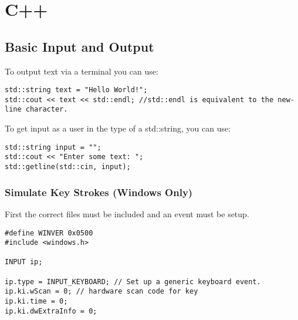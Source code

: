 \chapter{C++}
\thispagestyle{fancy}
\lstset{language=C++, style=cpp}

\section{Basic Input and Output}
To output text via a terminal you can use:
\begin{lstlisting}
std::string text = "Hello World!";
std::cout << text << std::endl; //std::endl is equivalent to the new-line character.
\end{lstlisting}

To get input as a user in the type of a std::string, you can use:
\begin{lstlisting}
std::string input = "";
std::cout << "Enter some text: ";
std::getline(std::cin, input);
\end{lstlisting}

\subsection{Simulate Key Strokes (Windows Only)}

First the correct files must be included and an event must be setup.
\begin{lstlisting}
#define WINVER 0x0500
#include <windows.h> 

INPUT ip;

ip.type = INPUT_KEYBOARD; // Set up a generic keyboard event.    
ip.ki.wScan = 0; // hardware scan code for key                                   
ip.ki.time = 0;
ip.ki.dwExtraInfo = 0;
\end{lstlisting}

